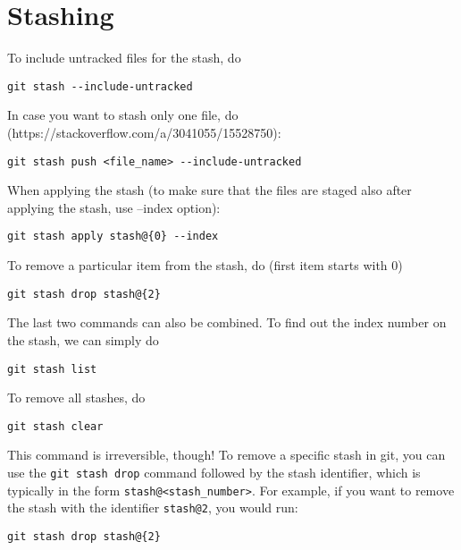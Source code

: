 \documentclass[12pt, a4paper]{scrbook}
\numberwithin{equation}{section}
\theoremstyle{definition}
\theoremstyle{definition}
\begin{document}
	\section{Stashing}

		To include untracked files for the stash, do
			\begin{lstlisting}[style=mystylebash, xleftmargin=\parindent]
				git stash --include-untracked
			\end{lstlisting}
		In case you want to stash only one file, do (https://stackoverflow.com/a/3041055/15528750):
			\begin{lstlisting}[style=mystylebash, xleftmargin=\parindent]
				git stash push <file_name> --include-untracked
			\end{lstlisting}
		When applying the stash (to make sure that the files are staged also after applying the stash, use --index option): 
			\begin{lstlisting}[style=mystylebash, xleftmargin=\parindent]
				git stash apply stash@{0} --index
			\end{lstlisting}
		To remove a particular item from the stash, do (first item starts with 0)
			\begin{lstlisting}[style=mystylebash, xleftmargin=\parindent]
				git stash drop stash@{2}
			\end{lstlisting}
		The last two commands can also be combined. To find out the index number on the stash, we can simply do
			\begin{lstlisting}[style=mystylebash, xleftmargin=\parindent]
				git stash list 
			\end{lstlisting}
		To remove all stashes, do
			\begin{lstlisting}[style=mystylebash, xleftmargin=\parindent]
				git stash clear
			\end{lstlisting}
		This command is irreversible, though! To remove a specific stash in git, you can use the \texttt{git stash drop} command followed by the stash identifier, which is typically in the form  \texttt{stash@{<stash_number>}}. For example, if you want to remove the stash with the identifier \texttt{stash@{2}}, you would run:                                                                                                                                                                                                    
			\begin{lstlisting}[style=mystylebash, xleftmargin=\parindent]
				git stash drop stash@{2}
			\end{lstlisting}
	
\end{document}
